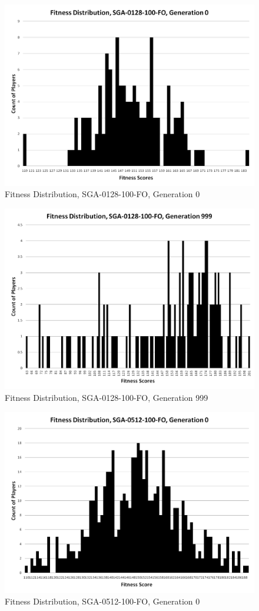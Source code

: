 \begin{figure}[htp]
\centerline{\includegraphics[width=0.75\columnwidth]{Figures/SGA_0128_100_FO_gen000.png}}
\caption{Fitness Distribution, SGA-0128-100-FO, Generation 0}
\end{figure}

\begin{figure}[htp]
\centerline{\includegraphics[width=0.75\columnwidth]{Figures/SGA_0128_100_FO_gen999.png}}
\caption{Fitness Distribution, SGA-0128-100-FO, Generation 999}
\end{figure}

\begin{figure}[htp]
\centerline{\includegraphics[width=0.75\columnwidth]{Figures/SGA_0512_100_FO_gen000.png}}
\caption{Fitness Distribution, SGA-0512-100-FO, Generation 0}
\end{figure}


